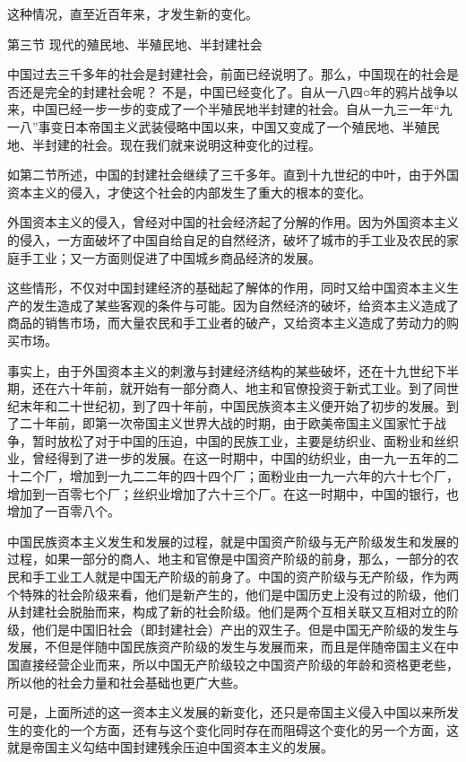 \documentclass[UTF8, 12pt, a4paper]{ctexrep}
\begin{document}
这种情况，直至近百年来，才发生新的变化。

第三节 现代的殖民地、半殖民地、半封建社会

中国过去三千多年的社会是封建社会，前面已经说明了。那么，中国现在的社会是否还是完全的封建社会呢？ 不是，中国已经变化了。自从一八四○年的鸦片战争以来，中国已经一步一步的变成了一个半殖民地半封建的社会。自从一九三一年“九一八”事变日本帝国主义武装侵略中国以来，中国又变成了一个殖民地、半殖民地、半封建的社会。现在我们就来说明这种变化的过程。

如第二节所述，中国的封建社会继续了三千多年。直到十九世纪的中叶，由于外国资本主义的侵入，才使这个社会的内部发生了重大的根本的变化。

外国资本主义的侵入，曾经对中国的社会经济起了分解的作用。因为外国资本主义的侵入，一方面破坏了中国自给自足的自然经济，破坏了城市的手工业及农民的家庭手工业；又一方面则促进了中国城乡商品经济的发展。

这些情形，不仅对中国封建经济的基础起了解体的作用，同时又给中国资本主义生产的发生造成了某些客观的条件与可能。因为自然经济的破坏，给资本主义造成了商品的销售市场，而大量农民和手工业者的破产，又给资本主义造成了劳动力的购买市场。

事实上，由于外国资本主义的刺激与封建经济结构的某些破坏，还在十九世纪下半期，还在六十年前，就开始有一部分商人、地主和官僚投资于新式工业。到了同世纪末年和二十世纪初，到了四十年前，中国民族资本主义便开始了初步的发展。到了二十年前，即第一次帝国主义世界大战的时期，由于欧美帝国主义国家忙于战争，暂时放松了对于中国的压迫，中国的民族工业，主要是纺织业、面粉业和丝织业，曾经得到了进一步的发展。在这一时期中，中国的纺织业，由一九一五年的二十二个厂，增加到一九二二年的四十四个厂；面粉业由一九一六年的六十七个厂，增加到一百零七个厂；丝织业增加了六十三个厂。在这一时期中，中国的银行，也增加了一百零八个。

中国民族资本主义发生和发展的过程，就是中国资产阶级与无产阶级发生和发展的过程，如果一部分的商人、地主和官僚是中国资产阶级的前身，那么，一部分的农民和手工业工人就是中国无产阶级的前身了。中国的资产阶级与无产阶级，作为两个特殊的社会阶级来看，他们是新产生的，他们是中国历史上没有过的阶级，他们从封建社会脱胎而来，构成了新的社会阶级。他们是两个互相关联又互相对立的阶级，他们是中国旧社会（即封建社会）产出的双生子。但是中国无产阶级的发生与发展，不但是伴随中国民族资产阶级的发生与发展而来，而且是伴随帝国主义在中国直接经营企业而来，所以中国无产阶级较之中国资产阶级的年龄和资格更老些，所以他的社会力量和社会基础也更广大些。

可是，上面所述的这一资本主义发展的新变化，还只是帝国主义侵入中国以来所发生的变化的一个方面，还有与这个变化同时存在而阻碍这个变化的另一个方面，这就是帝国主义勾结中国封建残余压迫中国资本主义的发展。
\end{document}
